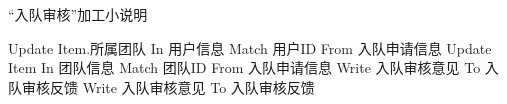 \begin{algorithm}[H]
    \renewcommand{\thealgorithm}{}
    \caption{“入队审核”加工小说明} 
    \label{alg3} 
    \begin{algorithmic}[1]
        \STATE Update Item.所属团队 In 用户信息 Match 用户ID From 入队申请信息
        \STATE Update Item In 团队信息 Match 团队ID From 入队申请信息
        \STATE Write 入队审核意见  To 入队审核反馈
        \ELSE
        \STATE Write 入队审核意见  To 入队审核反馈 
        \ENDIF 
    \end{algorithmic} 
\end{algorithm}
